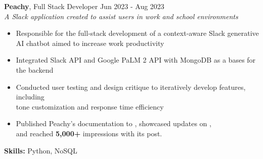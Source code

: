 \documentclass[letterpaper, 10pt]{article}
\newcommand{\secStartSpace}{\vspace{3pt}}
\newcommand{\secEndSpace}{\vspace{5pt}}
\begin{document}
\secStartSpace
\noindent \normalsize \textbf{Peachy}, Full Stack Developer \hfill \normalsize{Jun 2023 - Aug 2023}\\
\textit{A Slack application created to assist users in work and school environments}
\setlength \parindent{1cm} 
    \vspace{-5pt}
    \noindent \hspace{-10pt} \begin{itemize} 
        \item Responsible for the full-stack development of a context-aware Slack generative\\
        AI chatbot aimed to increase work productivity
        \vspace{-6pt}
        \item Integrated Slack API and Google PaLM 2 API with MongoDB as a bases for the backend
        \vspace{-6pt}
        \item Conducted user testing and design critique to iteratively develop features, including\\
        tone customization and response time efficiency 
        \vspace{-6pt}
        \item Published Peachy's documentation to \href{https://github.com/pamela-pan/peachy}{\color{blue}{GitHub}}, showcased updates on \href{https://youtu.be/CNDHOZP25fg?si=DqhnNwuIOLd0C-A8}{\color{blue}{YouTube}},\\
        and reached \textbf{5,000+} impressions with its \href{https://www.linkedin.com/feed/update/urn:li:activity:7099082369512402944?utm_source=share&utm_medium=member_desktop}{\color{blue}{LinkedIn}} post.
    \end{itemize}
    \vspace{-5pt} \hspace{0pt}
    \textbf{Skills:}  Python, NoSQL
\secEndSpace
\end{document}
